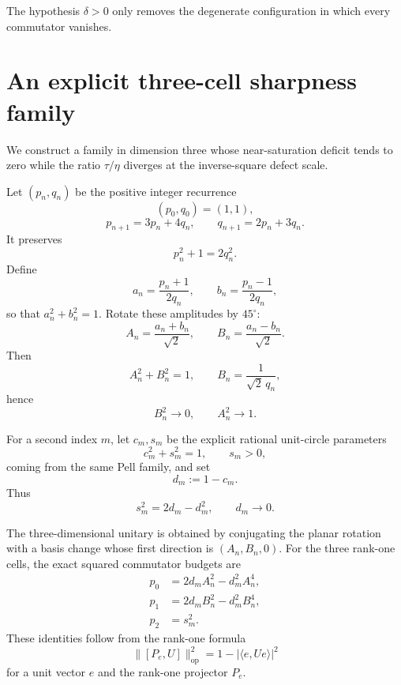 \documentclass[11pt]{article}
\newcommand{\op}{\mathrm{op}}
\newcommand{\dd}{\delta}
\newcommand{\etaq}{\eta}
\newcommand{\tauq}{\tau}
\begin{document}
The hypothesis $\dd>0$ only removes the degenerate configuration in which
every commutator vanishes.


\section{An explicit three-cell sharpness family}\label{sec:sharp}

We construct a family in dimension three whose near-saturation deficit tends
to zero while the ratio $\tauq/\etaq$ diverges at the inverse-square defect
scale.

Let $(p_n,q_n)$ be the positive integer recurrence
\[
  (p_0,q_0)=(1,1),
\]
\[
  p_{n+1}=3p_n+4q_n,
  \qquad
  q_{n+1}=2p_n+3q_n.
\]
It preserves
\begin{equation}\label{eq:pell}
  p_n^2+1=2q_n^2.
\end{equation}
Define
\[
  a_n=\frac{p_n+1}{2q_n},
  \qquad
  b_n=\frac{p_n-1}{2q_n},
\]
so that $a_n^2+b_n^2=1$.  Rotate these amplitudes by $45^\circ$:
\begin{equation}\label{eq:AB}
  A_n=\frac{a_n+b_n}{\sqrt2},
  \qquad
  B_n=\frac{a_n-b_n}{\sqrt2}.
\end{equation}
Then
\[
  A_n^2+B_n^2=1,\qquad
  B_n=\frac{1}{\sqrt2\,q_n},
\]
hence
\begin{equation}\label{eq:AB-limits}
  B_n^2\to0,\qquad A_n^2\to1.
\end{equation}

For a second index $m$, let $c_m,s_m$ be the explicit rational unit-circle
parameters
\[
  c_m^2+s_m^2=1,\qquad s_m>0,
\]
coming from the same Pell family, and set
\begin{equation}\label{eq:d}
  d_m:=1-c_m.
\end{equation}
Thus
\begin{equation}\label{eq:s-d}
  s_m^2=2d_m-d_m^2,
  \qquad
  d_m\to0.
\end{equation}

The three-dimensional unitary is obtained by conjugating the planar rotation
with a basis change whose first direction is
$(A_n,B_n,0)$.  For the three rank-one cells, the exact squared commutator
budgets are
\begin{align}
  p_0 &=
  2d_mA_n^2-d_m^2A_n^4, \label{eq:p0}\\
  p_1 &=
  2d_mB_n^2-d_m^2B_n^4, \label{eq:p1}\\
  p_2 &= s_m^2. \label{eq:p2}
\end{align}
These identities follow from the rank-one formula
\begin{equation}\label{eq:rankone}
  \boxed{
  \|[P_e,U]\|_{\op}^2
  =
  1-\bigl|\langle e,Ue\rangle\bigr|^2
  }
\end{equation}
for a unit vector $e$ and the rank-one projector $P_e$.
\end{document}

